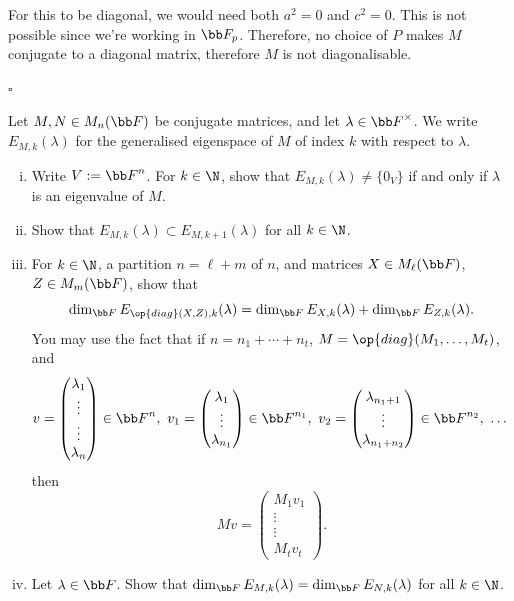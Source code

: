 \documentclass[a4paper]{article}
\begin{document}
For this to be diagonal, we would need both $a^2 = 0$ and $c^2 = 0$. This is not possible since we're working in $\bb F_p$. Therefore, no choice of $P$ makes $M$ conjugate to a diagonal matrix, therefore $M$ is not diagonalisable.

\hfill $\square$



\begin{questionbody}
Let $M, N \in M_n(\bb F)$ be conjugate matrices, and let $\lambda \in {\bb F}^\times$. We write $E_{M, k}(\lambda)$ for the generalised eigenspace of $M$ of index $k$ with respect to $\lambda$.
\begin{enumerate}[(i)]
\item Write $V := {\bb F}^n$. For $k \in \N$, show that $E_{M, k}(\lambda) \ne \{0_V\}$ if and only if $\lambda$ is an eigenvalue of $M$.

\item Show that $E_{M, k}(\lambda) \subset E_{M, k+1}(\lambda)$ for all $k \in \N$.

\item For $k \in \N$, a partition $n = \ell + m$ of $n$, and matrices $X \in M_\ell(\bb F)$, $Z \in M_m(\bb F)$, show that \[
\dim_{\bb F} E_{\op{diag}(X, Z), k}(\lambda) =
\dim_{\bb F} E_{X, k}(\lambda) + \dim_{\bb F} E_{Z, k}(\lambda).
\] You may use the fact that if $n = n_1 + \dotsb + n_t$, $M = \op{diag}(M_1, \dotsc, M_t)$, and \[
v = \begin{pmatrix} \lambda_1 \\ \vdots \\ \vdots \\ \lambda_n \end{pmatrix} \in {\bb F}^n,
\ v_1 = \begin{pmatrix} \lambda_1 \\ \vdots \\ \lambda_{n_1} \end{pmatrix} \in {\bb F}^{n_1},
\ v_2 = \begin{pmatrix} \lambda_{n_1 + 1} \\ \vdots \\ \lambda_{n_1 + n_2} \end{pmatrix} \in {\bb F}^{n_2},
\ \dotsc
\] then \[
M v = \begin{pmatrix} M_1 v_1 \\ \vdots \\ \vdots \\ M_t v_t \end{pmatrix}.
\]

\item Let $\lambda \in \bb F$. Show that $\dim_{\bb F} E_{M, k}(\lambda) = \dim_{\bb F} E_{N, k}(\lambda)$ for all $k \in \N$.
\end{enumerate}
\end{questionbody}
\end{document}
